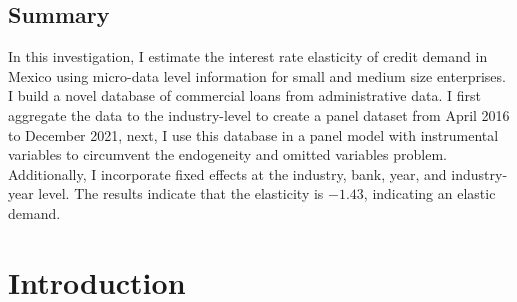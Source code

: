 \documentclass[11pt, oneside]{book}
\begin{document}
\pagestyle{plain}


\noindent 


\tableofcontents


\listoftables

\listoffigures


\newpage
\noindent 


\section*{Summary}

\noindent In this investigation, I estimate the interest rate elasticity of credit demand in Mexico using micro-data level information for small and medium size enterprises. I build a novel database of commercial loans from administrative data. I first aggregate the data to the industry-level to create a panel dataset from April 2016 to December 2021, next, I use this database in a panel model with instrumental variables to circumvent the endogeneity and omitted variables problem. Additionally, I incorporate fixed effects at the industry, bank, year, and industry-year level. The results indicate that the elasticity is $-1.43$, indicating an elastic demand. 

\pagestyle{plain}


\mainmatter %

\pagestyle{plain}



\chapter{Introduction}
\end{document}
